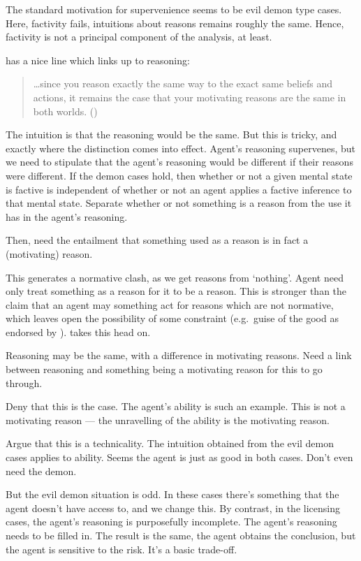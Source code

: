 \documentclass[10pt]{article}
\begin{document}
\begin{note}
  The standard motivation for supervenience seems to be evil demon type cases.
  Here, factivity fails, intuitions about reasons remains roughly the same.
  Hence, factivity is not a principal component of the analysis, at least.

  \citeauthor{Singh:2019aa} has a nice line which links up to reasoning:
  \begin{quote}
    \dots since you reason exactly the same way to the exact same beliefs and actions, it remains the case that your motivating reasons are the same in both worlds.\nolinebreak
    \mbox{}\hfill\mbox{(\citeyear[5]{Singh:2019aa})}
  \end{quote}
  The intuition is that the reasoning would be the same.
  But this is tricky, and exactly where the distinction comes into effect.
  Agent's reasoning supervenes, but we need to stipulate that the agent's reasoning would be different if their reasons were different.
  If the demon cases hold, then whether or not a given mental state is factive is independent of whether or not an agent applies a factive inference to that mental state.
  Separate whether or not something is a reason from the use it has in the agent's reasoning.

  Then, need the entailment that something used as a reason is in fact a (motivating) reason.

  This generates a normative clash, as we get reasons from `nothing'.
  Agent need only treat something as a reason for it to be a reason.
  This is stronger than the claim that an agent may something act for reasons which are not normative, which leaves open the possibility of some constraint (e.g.\ guise of the good as endorsed by \citeauthor{Singh:2019aa}).
  \citeauthor{Schroeder:2007aa} takes this head on.

  Reasoning may be the same, with a difference in motivating reasons.
  Need a link between reasoning and something being a motivating reason for this to go through.

  Deny that this is the case.
  The agent's ability is such an example.
  This is not a motivating reason --- the unravelling of the ability is the motivating reason.

  Argue that this is a technicality.
  The intuition obtained from the evil demon cases applies to ability.
  Seems the agent is just as good in both cases.
  Don't even need the demon.

  But the evil demon situation is odd.
  In these cases there's something that the agent doesn't have access to, and we change this.
  By contrast, in the licensing cases, the agent's reasoning is purposefully incomplete.
  The agent's reasoning needs to be filled in.
  The result is the same, the agent obtains the conclusion, but the agent is sensitive to the risk.
  It's a basic trade-off.
\end{note}
\end{document}
